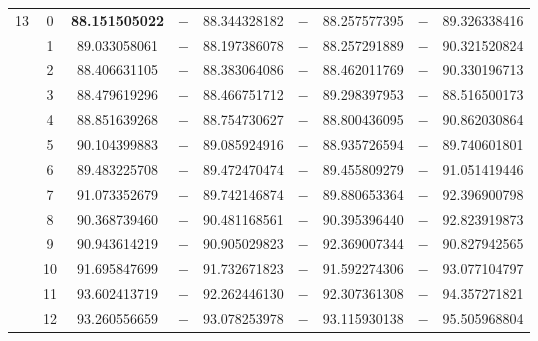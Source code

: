 \begin{table}[ht]
{\begin{tabular}{c|c|c|c|c|c|c|c|c}
\hline                    %
\multirow{13}{*}{13} & 0 & \textbf{88.151505022} & $-$ & 88.344328182 & $-$ & 88.257577395 & $-$ & 89.326338416 \\
& 1 & 89.033058061 & $-$ & 88.197386078 & $-$ & 88.257291889 & $-$ & 90.321520824 \\
& 2 & 88.406631105 & $-$ & 88.383064086 & $-$ & 88.462011769 & $-$ & 90.330196713 \\
& 3 & 88.479619296 & $-$ & 88.466751712 & $-$ & 89.298397953 & $-$ & 88.516500173 \\
& 4 & 88.851639268 & $-$ & 88.754730627 & $-$ & 88.800436095 & $-$ & 90.862030864 \\
& 5 & 90.104399883 & $-$ & 89.085924916 & $-$ & 88.935726594 & $-$ & 89.740601801 \\
& 6 & 89.483225708 & $-$ & 89.472470474 & $-$ & 89.455809279 & $-$ & 91.051419446 \\
& 7 & 91.073352679 & $-$ & 89.742146874 & $-$ & 89.880653364 & $-$ & 92.396900798 \\
& 8 & 90.368739460 & $-$ & 90.481168561 & $-$ & 90.395396440 & $-$ & 92.823919873 \\
& 9 & 90.943614219 & $-$ & 90.905029823 & $-$ & 92.369007344 & $-$ & 90.827942565 \\
& 10 & 91.695847699 & $-$ & 91.732671823 & $-$ & 91.592274306 & $-$ & 93.077104797 \\
& 11 & 93.602413719 & $-$ & 92.262446130 & $-$ & 92.307361308 & $-$ & 94.357271821 \\
& 12 & 93.260556659 & $-$ & 93.078253978 & $-$ & 93.115930138 & $-$ & 95.505968804 \\


\end{tabular}}
\end{table}

